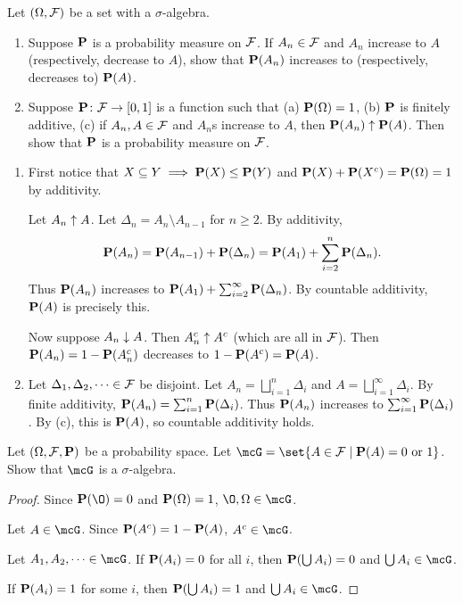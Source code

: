 \documentclass[12pt]{article}
\begin{document}
\begin{problem}
    Let $(\Omega, \F)$ be a set with a $\sigma$-algebra.
    \begin{enumerate}[(1)]
        \item Suppose $\P$ is a probability measure on $\F$.
        If $A_n \in \F$ and $A_n$ increase to $A$
        (respectively, decrease to $A$),
        show that $\P(A_n)$ increases to (respectively, decreases to)
        $\P(A)$.
        \item Suppose $\P\colon \F \to [0, 1]$ is a function such that
        (a) $\P(\Omega) = 1$, (b) $\P$ is finitely additive,
        (c) if $A_n, A \in \F$ and $A_n$s increase to $A$,
        then $\P(A_n) \upto \P(A)$.
        Then show that $\P$ is a probability measure on $\F$.
    \end{enumerate}
\end{problem}
\begin{solution} \leavevmode
    \begin{enumerate}[(1)]
        \item First notice that $X \subseteq Y \implies \P(X) \le \P(Y)$ and
        $\P(X) + \P(X^c) = \P(\Omega) = 1$ by additivity.

        Let $A_n \upto A$.
        Let $\Delta_n = A_n \setminus A_{n-1}$ for $n \ge 2$.
        By additivity, \[
            \P(A_n) = \P(A_{n-1}) + \P(\Delta_n)
                = \P(A_1) + \sum_{i=2}^n \P(\Delta_n).
        \] Thus $\P(A_n)$ increases to
        $\P(A_1) + \sum_{i=2}^\infty \P(\Delta_n)$.
        By countable additivity, $\P(A)$ is precisely this.

        Now suppose $A_n \downto A$.
        Then $A_n^c \upto A^c$ (which are all in $\F$).
        Then $\P(A_n) = 1 - \P(A_n^c)$ decreases to $1 - \P(A^c) = \P(A)$.
        \item Let $\Delta_1, \Delta_2, \dots \in \F$ be disjoint.
        Let $A_n = \bigsqcup_{i=1}^n \Delta_i$ and
        $A = \bigsqcup_{i=1}^\infty \Delta_i$.
        By finite additivity, $\P(A_n) = \sum_{i=1}^n \P(\Delta_i)$.
        Thus $\P(A_n)$ increases to
        $\sum_{i=1}^\infty \P(\Delta_i)$.
        By (c), this is $\P(A)$, so countable additivity holds. \qedhere
    \end{enumerate}
\end{solution}

\begin{problem}
    Let $(\Omega, \F, \P)$ be a probability space.
    Let $\mcG = \set{A \in \F \mid \P(A) = 0 \text{ or } 1}$.
    Show that $\mcG$ is a $\sigma$-algebra.
\end{problem}
\begin{proof}
    Since $\P(\O) = 0$ and $\P(\Omega) = 1$, $\O, \Omega \in \mcG$.

    Let $A \in \mcG$.
    Since $\P(A^c) = 1 - \P(A)$, $A^c \in \mcG$.

    Let $A_1, A_2, \dots \in \mcG$.
    If $\P(A_i) = 0$ for all $i$, then
    $\P(\bigcup A_i) = 0$ and $\bigcup A_i \in \mcG$.

    If $\P(A_i) = 1$ for some $i$, then
    $\P(\bigcup A_i) = 1$ and $\bigcup A_i \in \mcG$.
\end{proof}
\end{document}
